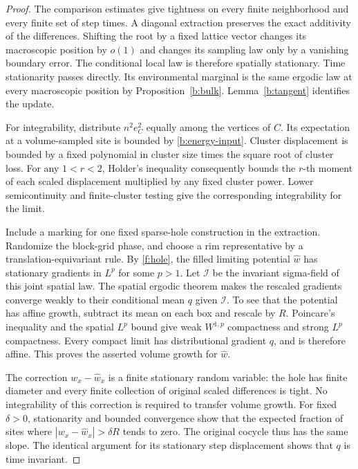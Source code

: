 \begin{proof}
The comparison estimates give tightness on every finite neighborhood and
every finite set of step times. A diagonal extraction preserves the exact
additivity of the differences. Shifting the root by a fixed lattice vector
changes its macroscopic position by $o(1)$ and changes its sampling law
only by a vanishing boundary error. The conditional local law is therefore
spatially stationary. Time stationarity passes directly. Its environmental
marginal is the same ergodic law at every macroscopic position by
Proposition~\ref{b:bulk}. Lemma~\ref{b:tangent} identifies the update.

For integrability, distribute $n^2 e_C^2$ equally among the vertices of
$C$. Its expectation at a volume-sampled site is bounded by
\eqref{b:energy-input}. Cluster displacement is bounded by a fixed
polynomial in cluster size times the square root of cluster loss.
For any $1<r<2$, Holder's inequality consequently bounds the $r$-th
moment of each scaled displacement multiplied by any fixed cluster power.
Lower semicontinuity and finite-cluster testing give the corresponding
integrability for the limit.

Include a marking for one fixed sparse-hole construction in the extraction.
Randomize the block-grid phase, and choose a rim representative by a
translation-equivariant rule. By \ref{f:hole}, the filled limiting
potential $\widehat w$ has stationary gradients in $L^p$ for some $p>1$.
Let $\mathcal I$ be the invariant sigma-field of this joint spatial law.
The spatial ergodic theorem makes the rescaled gradients converge weakly
to their conditional mean $q$ given $\mathcal I$. To see that the potential
has affine growth, subtract its mean on each box and rescale by $R$.
Poincare's inequality and the spatial $L^p$ bound give weak
$W^{1,p}$ compactness and strong $L^p$ compactness. Every compact limit
has distributional gradient $q$, and is therefore affine. This proves
the asserted volume growth for $\widehat w$.

The correction $w_x-\widehat w_x$ is a finite stationary random variable:
the hole has finite diameter and every finite collection of original
scaled differences is tight. No integrability of this correction is
required to transfer volume growth. For fixed $\delta>0$, stationarity
and bounded convergence show that the expected fraction of sites where
$|w_x-\widehat w_x|>\delta R$ tends to zero. The original cocycle thus
has the same slope. The identical argument for its stationary step
displacement shows that $q$ is time invariant.


\end{proof}
